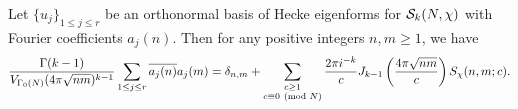     \begin{theorem}
      Let $\{u_{j}\}_{1 \le j \le r}$ be an orthonormal basis of Hecke eigenforms for $\mathcal{S}_{k}(N,\chi)$ with Fourier coefficients $a_{j}(n)$. Then for any positive integers $n,m \ge 1$, we have
      \[
        \frac{\Gamma(k-1)}{V_{\Gamma_{0}(N)}(4\pi\sqrt{nm})^{k-1}}\sum_{1 \le j \le r}\overline{a_{j}(n)}a_{j}(m) = \delta_{n,m}+\sum_{\substack{c \ge 1 \\ c \equiv 0 \ \left(\text{mod }N\right)}}\frac{2\pi i^{-k}}{c}J_{k-1}\left(\frac{4\pi\sqrt{nm}}{c}\right)S_{\chi}(n,m;c).
      \]
    \end{theorem}